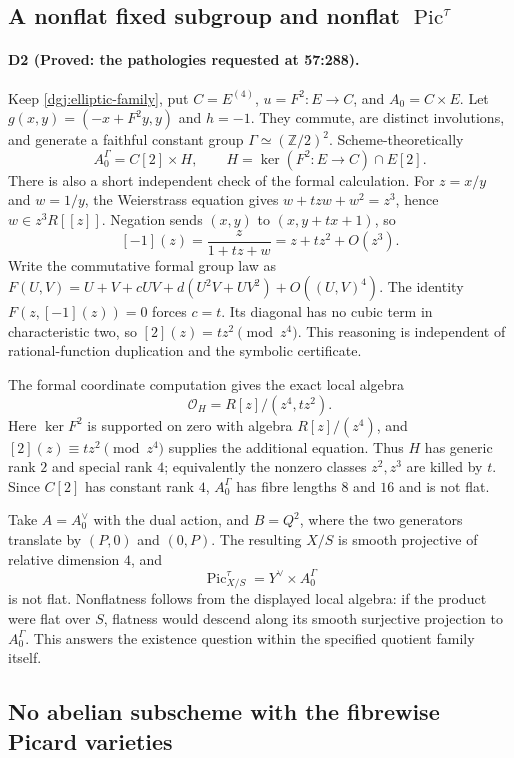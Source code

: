 \subsection{A nonflat fixed subgroup and nonflat $\operatorname{Pic}^{\tau}$}
\paragraph{D2 (Proved: the pathologies requested at 57:288).}
Keep \eqref{dgj:elliptic-family}, put $C=E^{(4)}$, $u=F^2:E\to C$, and
$A_0=C\times E$.  Let $g(x,y)=(-x+F^2y,y)$ and $h=-1$.  They commute,
are distinct involutions, and generate a faithful constant group
$\Gamma\simeq(\mathbb Z/2)^2$.  Scheme-theoretically
\[
 A_0^\Gamma=C[2]\times H,
 \qquad H=\ker(F^2:E\to C)\cap E[2].
\]
There is also a short independent check of the formal calculation.
For $z=x/y$ and $w=1/y$, the Weierstrass equation gives
$w+tzw+w^2=z^3$, hence $w\in z^3R[[z]]$.
Negation sends $(x,y)$ to $(x,y+tx+1)$, so
\[
 [-1](z)=\frac{z}{1+tz+w}=z+tz^2+O(z^3).
\]
Write the commutative formal group law as
$F(U,V)=U+V+cUV+d(U^2V+UV^2)+O((U,V)^4)$.
The identity $F(z,[-1](z))=0$ forces $c=t$.
Its diagonal has no cubic term in characteristic two, so
$[2](z)=tz^2\pmod {z^4}$.  This reasoning is independent of
rational-function duplication and the symbolic certificate.

The formal coordinate computation gives the exact local algebra
\[
 \mathcal O_H=R[z]/(z^4,tz^2).
\]
Here $\ker F^2$ is supported on zero with algebra $R[z]/(z^4)$, and
$[2](z)\equiv tz^2\pmod {z^4}$ supplies the additional equation.
Thus $H$ has generic rank $2$ and special rank $4$; equivalently the
nonzero classes $z^2,z^3$ are killed by $t$.  Since $C[2]$ has constant
rank $4$, $A_0^\Gamma$ has fibre lengths $8$ and $16$ and is not flat.

Take $A=A_0^\vee$ with the dual action, and $B=Q^2$, where the two
generators translate by $(P,0)$ and $(0,P)$.  The resulting $X/S$ is
smooth projective of relative dimension $4$, and
\[
 \operatorname{Pic}^{\tau}_{X/S}=Y^\vee\times A_0^\Gamma
\]
is not flat.  Nonflatness follows from the displayed local algebra:
if the product were flat over $S$, flatness would descend along its
smooth surjective projection to $A_0^\Gamma$.  This answers the existence question within the specified
quotient family itself.

\subsection{No abelian subscheme with the fibrewise Picard varieties}
